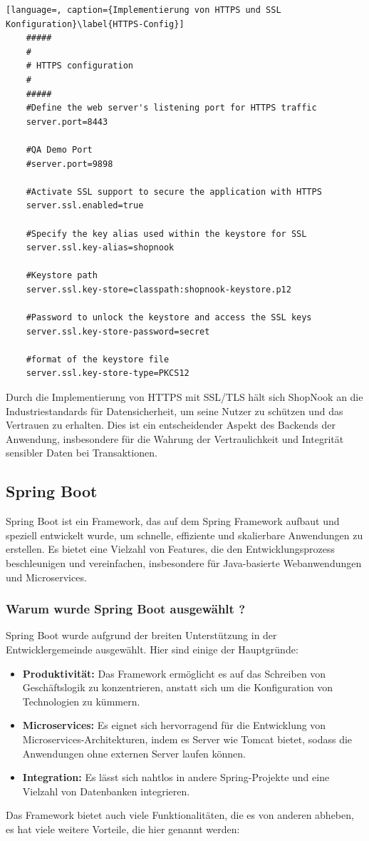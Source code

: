 \begin{lstlisting}[language=, caption={Implementierung von HTTPS und SSL Konfiguration}\label{HTTPS-Config}]
	#####
	#
	# HTTPS configuration
	#
	#####
	#Define the web server's listening port for HTTPS traffic
	server.port=8443 
	
	#QA Demo Port
	#server.port=9898
	
	#Activate SSL support to secure the application with HTTPS
	server.ssl.enabled=true
	
	#Specify the key alias used within the keystore for SSL
	server.ssl.key-alias=shopnook
	
	#Keystore path
	server.ssl.key-store=classpath:shopnook-keystore.p12
	
	#Password to unlock the keystore and access the SSL keys
	server.ssl.key-store-password=secret
	
	#format of the keystore file
	server.ssl.key-store-type=PKCS12
\end{lstlisting}



Durch die Implementierung von HTTPS mit SSL/TLS hält sich ShopNook an die Industriestandards für Datensicherheit, um seine Nutzer zu schützen und das Vertrauen zu erhalten. Dies ist ein entscheidender Aspekt des Backends der Anwendung, insbesondere für die Wahrung der Vertraulichkeit und Integrität sensibler Daten bei Transaktionen.

\subsection{Spring Boot}

Spring Boot ist ein Framework, das auf dem Spring Framework aufbaut und speziell entwickelt wurde, um schnelle, effiziente und skalierbare Anwendungen zu erstellen. Es bietet eine Vielzahl von Features, die den Entwicklungsprozess beschleunigen und vereinfachen, insbesondere für Java-basierte Webanwendungen und Microservices.

\subsubsection{Warum wurde Spring Boot ausgewählt ?}
Spring Boot wurde aufgrund der breiten Unterstützung in der Entwicklergemeinde ausgewählt. Hier sind einige der Hauptgründe:
\begin{itemize}
	\item \textbf{Produktivität:} Das Framework ermöglicht es auf das Schreiben von Geschäftslogik zu konzentrieren, anstatt sich um die Konfiguration von Technologien zu kümmern.
	\item \textbf{Microservices:} Es eignet sich hervorragend für die Entwicklung von Microservices-Architekturen, indem es Server wie Tomcat bietet, sodass die Anwendungen ohne externen Server laufen können.
	\item \textbf{Integration:} Es lässt sich nahtlos in andere Spring-Projekte und eine Vielzahl von Datenbanken integrieren.
\end{itemize}
Das Framework bietet auch viele Funktionalitäten, die es von anderen abheben, es hat viele weitere Vorteile, die hier genannt werden:

